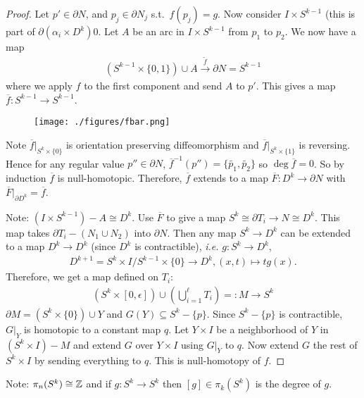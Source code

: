\documentclass[12pt,class=article,crop=false]{standalone}
\begin{document}
\begin{proof}
Let $ p' \in \partial N$, and $ p_j \in \partial  N_j$ s.t.\ $ f(p_j) = g$. Now consider $I \times  S^{k-1}$ (this is part of $ \partial ( \alpha_i \times D^{k})0$. Let $ A$ be an arc in  $ I \times S^{k-1}$ from $ p_1$ to $ p_2$. We now have a map
\begin{align*}
	(S^{k-1} \times \{0,1\} ) \cup A \xrightarrow{ \widetilde{ f}} \partial N = S^{k-1}
\end{align*}
where we apply $ f$ to the first component and send $ A$ to  $ p'$. This gives a map $ \overline{f}: S^{k-1} \to S^{k-1}$.
~\begin{figure}[H]
	\centering
	\texttt{[image: ./figures/fbar.png]}
\end{figure}
Note $ \overline{f}|_{S^{k} \times \{0\} }$ is orientation preserving diffeomorphism and $ \overline{f}|_{S^{k} \times \{1\} }$ is reversing. Hence for any regular value $ p'' \in \partial N$, $ \overline{f} ^{-1}(p'') = \{\widetilde{ p_1},\widetilde{ p_2}\}$ so $ \deg \overline{f} = 0$. So by induction $ \overline{f}$ is null-homotopic. Therefore, $ \overline{f}$ extends to a map $ \overline{F}: D^{k} \to \partial N$ with $ \overline{F}|_{ \partial D^{k}} = \overline{f}$.

Note: $ (I \times S^{k-1}) - A \cong D^{k}$. Use $ \overline{F}$ to give a map $S^{k} \cong \partial T_i \to N \cong D^{k}$. This map takes $ \partial T_i - (N_1 \cup N_2)$ into $ \partial N$. Then any map $ S^{k} \to D^{k}$ can be extended to a map $ D^{k} \to D^{k}$ (since $D^{k} $ is contractible), \emph{i.e.} $ g: S^{k} \to D^{k}$,
\begin{align*}
	D^{k+1} = S^{k} \times I / S^{k-1} \times \{0\} \to D^{k}, (x,t) \mapsto tg(x).
\end{align*}
Therefore, we get a map defined on $ T_i$:
\begin{align*}
	(S^{k} \times [0, \epsilon]) \cup (\bigcup_{ i= 1}^{\ell}T_i ) =:M \to S^{k}
\end{align*}
$ \partial M = (S^{k} \times \{0\} ) \cup Y$ and $ G(Y) \subseteq S^{k} - \{p\} $. Since $ S^{k} - \{p\} $ is contractible, $ G|_Y$ is homotopic to a constant map  $ q$. Let  $ Y \times I$ be a neighborhood of $ Y$ in  $ (S^{k} \times I) - M$ and extend $ G$ over  $ Y \times I$ using $ G|_Y$ to  $ q$. Now extend $ G$ the rest of $ S^{k} \times I$ by sending everything to $ q$. This is null-homotopy of  $ f$.
\end{proof}
Note: $ \pi_n(S^{k}) \cong \mathbb{Z}$ and if $ g: S^{k} \to S^{k}$ then $ [g] \in \pi_k(S^{k})$ is the degree of $ g$.
\end{document}
